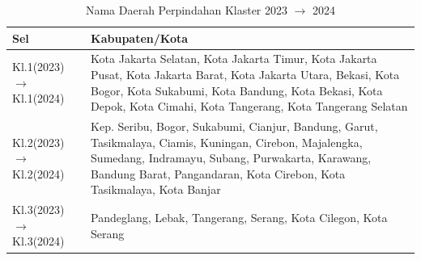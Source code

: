 \begin{table}[H]
\centering
\small
\caption{Nama Daerah Perpindahan Klaster 2023 \(\rightarrow\) 2024} \label{tab:transname2023x2024}
\begin{tabular}{|>{\raggedright\arraybackslash}m{}|>{\raggedright\arraybackslash}m{}|}
\hline
\textbf{Sel} & \textbf{Kabupaten/Kota} \\
\hline
Kl.1(2023) \(\rightarrow\) Kl.1(2024) & Kota Jakarta Selatan, Kota Jakarta Timur, Kota Jakarta Pusat, Kota Jakarta Barat, Kota Jakarta Utara, Bekasi, Kota Bogor, Kota Sukabumi, Kota Bandung, Kota Bekasi, Kota Depok, Kota Cimahi, Kota Tangerang, Kota Tangerang Selatan \\
\hline
Kl.2(2023) \(\rightarrow\) Kl.2(2024) & Kep. Seribu, Bogor, Sukabumi, Cianjur, Bandung, Garut, Tasikmalaya, Ciamis, Kuningan, Cirebon, Majalengka, Sumedang, Indramayu, Subang, Purwakarta, Karawang, Bandung Barat, Pangandaran, Kota Cirebon, Kota Tasikmalaya, Kota Banjar \\
\hline
Kl.3(2023) \(\rightarrow\) Kl.3(2024) & Pandeglang, Lebak, Tangerang, Serang, Kota Cilegon, Kota Serang \\
\hline
\end{tabular}
\end{table}